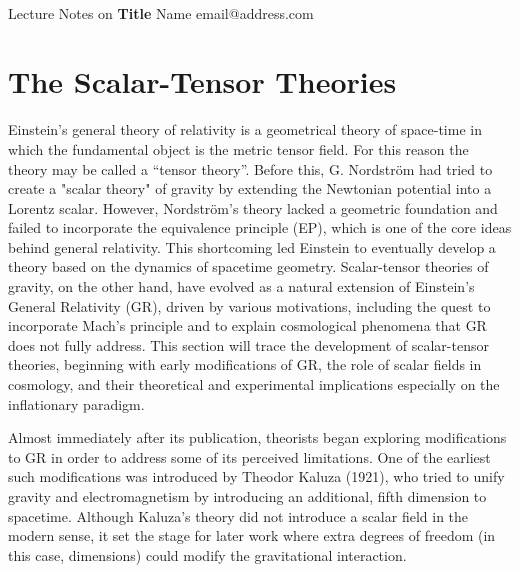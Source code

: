 \documentclass[12pt]{article}
\begin{document}
\thispagestyle{empty}
\bigskip \
\vspace{0.1cm}

\begin{center}
{\fontsize{22}{22} \selectfont Lecture Notes on}
\vskip 16pt
{\fontsize{36}{36} \selectfont \bf \sffamily Title}
\vskip 24pt
{\fontsize{18}{18} \selectfont \rmfamily Name} 
\vskip 6pt
{\fontsize{14}{14} \selectfont \ttfamily email@address.com} 
\vskip 24pt
\end{center}

{\parindent0pt \baselineskip=15.5pt \lipsum[1]}

\newpage
\microtoc
\newpage

\section{The Scalar-Tensor Theories}

Einstein’s general theory of relativity is a geometrical theory of space-time in which the fundamental object is the metric tensor field. For this reason the theory may be called a “tensor theory”. 
Before this, G. Nordström had tried to create a "scalar theory" of gravity by extending the Newtonian potential into a Lorentz scalar. 
However, Nordström's theory lacked a geometric foundation and failed to incorporate the equivalence principle (EP), which is one of the core ideas behind general relativity. 
This shortcoming led Einstein to eventually develop a theory based on the dynamics of spacetime geometry.
Scalar-tensor theories of gravity, on the other hand, have evolved as a natural extension of Einstein's General Relativity (GR), driven by various motivations, including the quest to incorporate Mach’s principle and to explain cosmological phenomena that GR does not fully address. 
This section will trace the development of scalar-tensor theories, beginning with early modifications of GR, the role of scalar fields in cosmology, and their theoretical and experimental implications especially on the inflationary paradigm.

Almost immediately after its publication, theorists began exploring modifications to GR in order to address some of its perceived limitations.
One of the earliest such modifications was introduced by Theodor Kaluza (1921), who tried to unify gravity and electromagnetism by introducing an additional, fifth dimension to spacetime. 
Although Kaluza’s theory did not introduce a scalar field in the modern sense, it set the stage for later work where extra degrees of freedom (in this case, dimensions) could modify the gravitational interaction.
\end{document}
